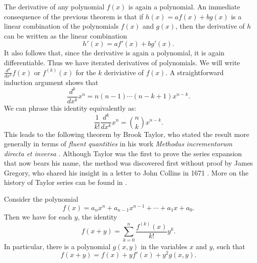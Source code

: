 The derivative of any polynomial $f(x)$ is again a polynomial. An immediate consequence of the previous theorem is that if $h(x)=af(x)+bg(x)$ is a linear combination of the polynomials $f(x)$ and $g(x)$, then the derivative of $h$ can be written as the linear combination
\begin{equation*}
  h'(x)=af'(x)+bg'(x).
\end{equation*}
It also follows that, since the derivative is again a polynomial, it is again differentiable. Thus we have iterated derivatives of polynomials. We will write $\frac{d^k}{dx^k}f(x)$ or $f^{(k)}(x)$ for the $k$\supth{} deriviative of $f(x)$. A straightforward induction argument shows that
\begin{equation*}
  \frac{d^k}{dx^k}x^n = n(n-1)\cdots (n-k+1)x^{n-k}.
\end{equation*}
We can phrase this identity equivalently as:
\begin{equation*}
  \frac{1}{k!}\frac{d^k}{dx^k}x^n = \binom{n}{k}x^{n-k}.
\end{equation*}
This leads to the following theorem by Brook Taylor, who stated the result more generally in terms of \emph{fluent quantities} in his work \emph{Methodus incrementorum directa et inversa} \cite{taylor1715}. Although Taylor was the first to prove the series expansion that now bears his name, the method was discovered first without proof by James Gregory, who shared his insight in a letter to John Collins in 1671 \cite{gregory1671}. More on the history of Taylor series can be found in \cite{feigenbaum1985}.

\begin{theorem}\label{theorem:taylor-expansion-theorem}
  Consider the polynomial
  \begin{equation*}
    f(x)=a_nx^n+a_{n-1}x^{n-1}+\cdots+a_1x+a_0.
  \end{equation*}
  Then we have for each $y$, the identity
  \begin{equation*}
    f(x+y)=\sum_{k=0}^n \frac{f^{(k)}(x)}{k!}y^{k}.
  \end{equation*}
  In particular, there is a polynomial $g(x,y)$ in the variables $x$ and $y$, such that
  \begin{equation*}
    f(x+y)=f(x)+yf'(x)+y^2g(x,y).
  \end{equation*}
\end{theorem}

